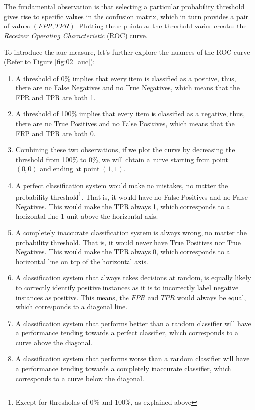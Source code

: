 The fundamental observation is that selecting a particular probability threshold gives rise to specific values in the confusion matrix, which in turn provides a pair of values $(FPR, TPR)$. Plotting these points as the threshold varies creates the \emph{Receiver Operating Characteristic} (ROC) curve.

To introduce the \gls{auc} measure, let's further explore the nuances of the ROC curve (Refer to Figure \ref{fig:02_auc}):


\begin{enumerate}
    \item A threshold of 0\% implies that every item is classified as a positive, thus, there are no False Negatives and no True Negatives, which means that the FPR and TPR are both 1.

    \item A threshold of 100\% implies that every item is classified as a negative, thus, there are no True Positives and no False Positives, which means that the FRP and TPR are both 0.

    \item Combining these two observations, if we plot the curve by decreasing the threshold from 100\% to 0\%, we will obtain a curve starting from point $(0,0)$ and ending at point $(1,1)$.

    \item A perfect classification system would make no mistakes, no matter the probability threshold\footnote{Except for thresholds of 0\% and 100\%, as explained above}. That is, it would have no False Positives and no False Negatives. This would make the TPR always 1, which corresponds to a horizontal line 1 unit above the horizontal axis. 

    \item A completely inaccurate classification system is always wrong, no matter the probability threshold. That is, it would never have True Positives nor True Negatives. This would make the TPR always 0, which corresponds to a horizontal line on top of the horizontal axis.

    \item A classification system that always takes decisions at random, is equally likely to correctly identify positive instances as it is to incorrectly label negative instances as positive. This means, the $FPR$ and $TPR$ would always be equal, which corresponds to a diagonal line.

    \item A classification system that performs better than a random classifier will have a performance tending towards a perfect classifier, which corresponds to a curve above the diagonal.

    \item A classification system that performs worse than a random classifier will have a performance tending towards a completely inaccurate classifier, which corresponds to a curve below the diagonal.

\end{enumerate}

